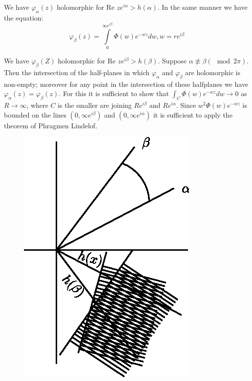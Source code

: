 We have $\varphi_\alpha (z)$ holomorphic for Re $z e^{i \alpha} > h
(\alpha)$. In the same manner we have the equation: 
\begin{equation*}
\varphi_\beta (z) = \int\limits^{\infty e^{i \beta}}_0 \Phi (w) e^{-wz} dw, w = r e^{i \beta} \tag{$2_\beta$}
\end{equation*}

\noindent 
\begin{minipage}[c]{5.8cm}
We have $\varphi_\beta (Z)$ holomorphic for Re $z e^{i \beta} > h
(\beta)$. Suppose $\alpha \nequiv \beta (\mod 2 \pi)$. Then the
intersection of the half-planes in which $\varphi_\alpha$ and
$\varphi_\beta$ are holomorphic is non-empty; moreover for any point
in the intersection of these halfplanes we have $\varphi_\alpha (z) =
\varphi_\beta (z)$. For this it is sufficient to show that $\int_C
\Phi (w) e^{-wz} dw \to 0$ as $R \to \infty$, where $C$ is the smaller are
joining $R e^{i \beta}$ and $R e^{i \alpha}$. Since $w^2 \Phi (w)
e^{-wz}$ is bounded on the lines $(0, \infty e^{i \beta})$ and $(0,
\infty e^{i \alpha})$ it is sufficient to apply the theorem of
Phragmen Lindelof. 
\end{minipage}
\begin{minipage}[c]{5cm}
\begin{figure}[H]
\centerline{\includegraphics{vol15-figures/fig15-1.eps}}
\end{figure}
\end{minipage}

